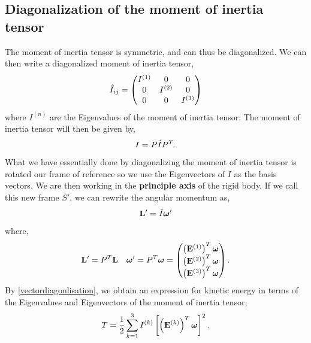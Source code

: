 \documentclass{book}
\begin{document}
\subsection{Diagonalization of the moment of inertia tensor}
The moment of inertia tensor is symmetric, and can thus be diagonalized. We can then write a diagonalized moment of inertia tensor,
\begin{equation}
    \Hat{I}_{ij} = \begin{pmatrix}
        I^{(1)} & 0 & 0 \\
        0 & I^{(2)} & 0 \\
        0 & 0 & I^{(3)}
    \end{pmatrix}
\end{equation}
where $I^{(n)}$ are the Eigenvalues of the moment of inertia tensor. The moment of inertia tensor will then be given by,
\begin{equation}
    I = P\Hat{I}P^T.
\end{equation}
What we have essentially done by diagonalizing the moment of inertia tensor is rotated our frame of reference so we use the Eigenvectors of $I$ as the basis vectors. We are then working in the \textbf{principle axis} of the rigid body. If we call this new frame $S'$, we can rewrite the angular momentum as,
\begin{equation}
    \vb{L}' = \Hat{I}\vb*{\omega}'
\end{equation}
where,
\begin{align}
    \vb{L}' = P^T\vb{L} && \vb*{\omega}' = P^T\vb*{\omega} = \begin{pmatrix}
        \left(\vb{E}^{(1)}\right)^T\vb*{\omega} \\ \left(\vb{E}^{(2)}\right)^T\vb*{\omega} \\ \left(\vb{E}^{(3)}\right)^T\vb*{\omega}
    \end{pmatrix}.
\end{align}
By \eqref{vectordiagonlisation}, we obtain an expression for kinetic energy in terms of the Eigenvalues and Eigenvectors of the moment of inertia tensor,
\begin{equation}
    T = \frac{1}{2}\sum_{k=1}^3I^{(k)}\left[\left(\vb{E}^{(k)}\right)^T\vb*{\omega}\right]^2.
\end{equation}
\end{document}
